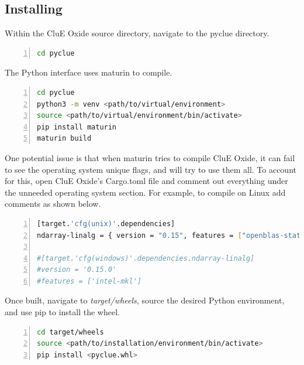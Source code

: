 \documentclass{book}
\begin{document}
\subsection{Installing}
Within the CluE Oxide source directory, navigate to the pyclue directory.
\begin{lstlisting}[frame=single,numbers=left,language=bash]
cd pyclue
\end{lstlisting}
The Python interface uses maturin\cite{maturin} to compile.
\begin{lstlisting}[frame=single,numbers=left,language=bash]
cd pyclue
python3 -m venv <path/to/virtual/environment>
source <path/to/virtual/environment/bin/activate>
pip install maturin
maturin build
\end{lstlisting}
One potential issue is that when maturin tries to compile CluE Oxide, 
it can fail to see the operating system unique flags, and will try to use them
all.  To account for this, open CluE Oxide's Cargo.toml file and comment out 
everything under the unneeded operating system section.  
For example, to compile on Linux add comments as shown below.
\begin{lstlisting}[frame=single,numbers=left,language=bash]
[target.'cfg(unix)'.dependencies]
ndarray-linalg = { version = "0.15", features = ["openblas-static"] }

#[target.'cfg(windows)'.dependencies.ndarray-linalg]
#version = '0.15.0'
#features = ['intel-mkl']
\end{lstlisting}
Once built, navigate to \textit{target/wheels}, source the desired
Python environment, and use pip to install the wheel.
\begin{lstlisting}[frame=single,numbers=left,language=bash]
cd target/wheels
source <path/to/installation/environment/bin/activate>
pip install <pyclue.whl>
\end{lstlisting}
\end{document}
